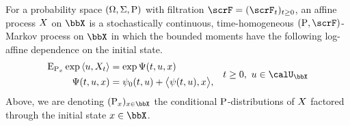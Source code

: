 \begin{definition}
  \label{definition:affine-process}
  For a probability space $(\Omega, \Sigma, {\operatorname{P}})$ with filtration $\scrF = (\scrF_t)_{t\geq0}$, an affine process $X$ on $\stateSpace$ is a stochastically continuous, time-homogeneous $(\Prb, \scrF)$-Markov process on $\stateSpace$ in which the bounded moments have the following log-affine dependence on the initial state.
  \begin{align}
    \label{eq:affine-definition}
    &\begin{aligned}
      \Exp_{\Prb_\stateVar}\exp\prj{\momentVar}{\X_t} &= \exp\aff(t, \momentVar, \stateVar) \\
      \aff(t, \momentVar, \stateVar) &= \affPart_0(t, \momentVar) + \bprj{\affPart(t, \momentVar)}{\stateVar},  \\
    \end{aligned}
    & t \geq 0, ~ \momentVar \in \boundedSpace
  \end{align}
  Above, we are denoting $(\Prb_\stateVar)_{\stateVar\in\stateSpace}$ the conditional ${\operatorname{P}}$-distributions of $X$ factored through the initial state $\stateVar \in \stateSpace$.
\end{definition}
